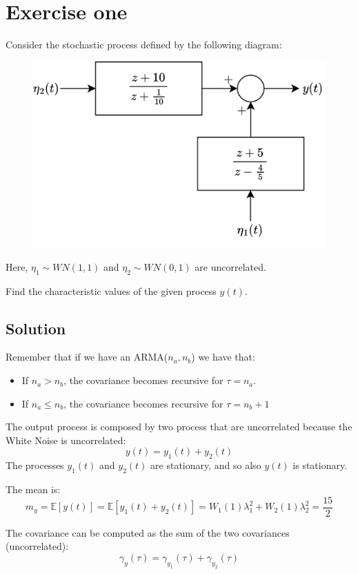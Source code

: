 \section{Exercise one}

Consider the stochastic process defined by the following diagram:
\begin{figure}[H]
    \centering
    \includegraphics[width=0.5\linewidth]{images/block.png}
\end{figure}
Here, $\eta_1 \sim WN(1,1)$ and $\eta_2 \sim WN(0,1)$ are uncorrelated. 

Find the characteristic values of the given process $y(t)$. 

\subsection{Solution}
Remember that if we have an ARMA($n_a,n_b$) we have that: 
\begin{itemize}
    \item If $n_a>n_b$, the covariance becomes recursive for $\tau=n_a$. 
    \item If $n_a \leq n_b$, the covariance becomes recursive for $\tau=n_b+1$
\end{itemize}

The output process is composed by two process that are uncorrelated because the White Noise is uncorrelated: 
\[y(t)=y_1(t)+y_2(t)\]
The processes $y_1(t)$ and $y_2(t)$ are stationary, and so also $y(t)$ is stationary. 

The mean is: 
\[m_y=\mathbb{E}\left[y(t)\right]=\mathbb{E}\left[y_1(t)+y_2(t)\right]=W_1(1)\lambda_1^2+W_2(1)\lambda_2^2=\dfrac{15}{2}\]

The covariance can be computed as the sum of the two covariances (uncorrelated): 
\[\gamma_y(\tau)=\gamma_{y_1}(\tau)+\gamma_{y_2}(\tau)\]

